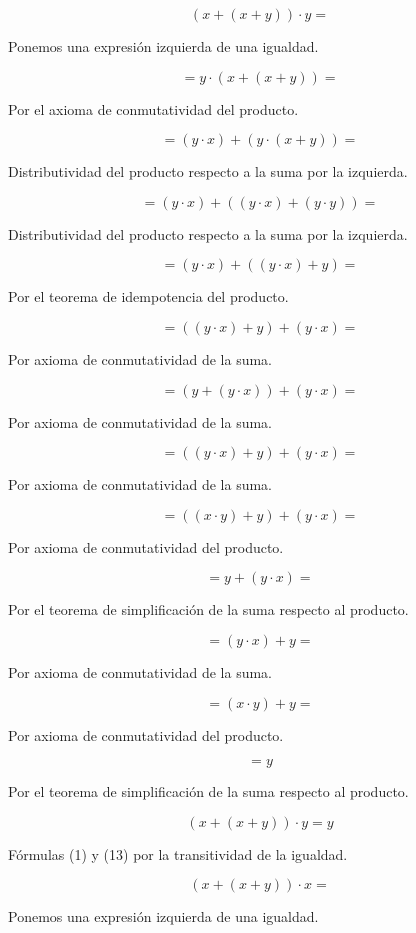 \[{{({x + {({x + y})}})} \cdot y} = {}\]

Ponemos una expresión izquierda de una igualdad.

\[{= {y \cdot {({x + {({x + y})}})}}} =\]

Por el axioma de conmutatividad del producto.

\[{= {{({y \cdot x})} + {({y \cdot {({x + y})}})}}} =\]

Distributividad del producto respecto a la suma por la izquierda.

\[{= {{({y \cdot x})} + {({{({y \cdot x})} + {({y \cdot y})}})}}} =\]

Distributividad del producto respecto a la suma por la izquierda.

\[{= {{({y \cdot x})} + {({{({y \cdot x})} + y})}}} =\]

Por el teorema de idempotencia del producto.

\[{= {{({{({y \cdot x})} + y})} + {({y \cdot x})}}} =\]

Por axioma de conmutatividad de la suma.

\[{= {{({y + {({y \cdot x})}})} + {({y \cdot x})}}} =\]

Por axioma de conmutatividad de la suma.

\[{= {{({{({y \cdot x})} + y})} + {({y \cdot x})}}} =\]

Por axioma de conmutatividad de la suma.

\[{= {{({{({x \cdot y})} + y})} + {({y \cdot x})}}} =\]

Por axioma de conmutatividad del producto.

\[{= {y + {({y \cdot x})}}} =\]

Por el teorema de simplificación de la suma respecto al producto.

\[{= {{({y \cdot x})} + y}} =\]

Por axioma de conmutatividad de la suma.

\[{= {{({x \cdot y})} + y}} =\]

Por axioma de conmutatividad del producto.

\[= y\]

Por el teorema de simplificación de la suma respecto al producto.

\[{{({x + {({x + y})}})} \cdot y} = y\]

Fórmulas (1) y (13) por la transitividad de la igualdad.

\[{{({x + {({x + y})}})} \cdot x} = {}\]

Ponemos una expresión izquierda de una igualdad.

